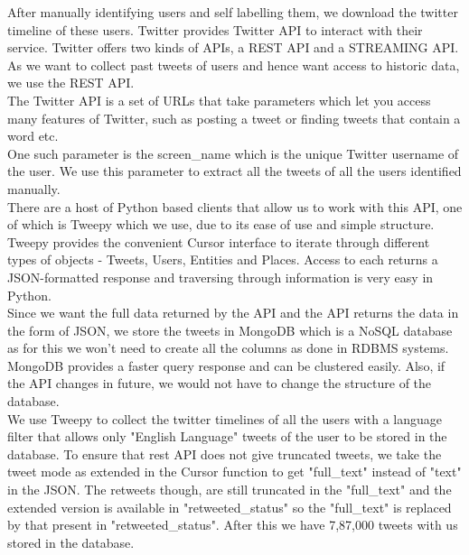 \documentclass[a4paper,11pt]{article}
\begin{document}
After manually identifying users and self labelling them, we download the twitter timeline of these users. Twitter provides Twitter API to interact with their service. Twitter offers two kinds of APIs, a REST API and a STREAMING API. As we want to collect past tweets of users and hence want access to historic data, we use the REST API.
\medskip\\
The Twitter API is a set of URLs that take parameters which let you access many features of Twitter, such as posting a tweet or finding tweets that contain a word etc. \\
One such parameter is the screen\_name which is the unique Twitter username of the user. We use this parameter to extract all the tweets of all the users identified manually.  
\medskip\\
There are a host of Python based clients that allow us to work with this API, one of which is Tweepy which we use, due to its ease of use and simple structure. Tweepy provides the convenient Cursor interface to iterate through different types of objects - Tweets, Users, Entities and Places. Access to each returns a JSON-formatted response and traversing through information is very easy in Python. 
\medskip\\
Since we want the full data returned by the API and the API returns the data in the form of JSON, we store the tweets in MongoDB which is a NoSQL database as for this we won’t need to create all the columns as done in RDBMS systems. MongoDB provides a faster query response and can be clustered easily. Also, if the API changes in future, we would not have to change the structure of the database.
\medskip\\
We use Tweepy to collect the twitter timelines of all the users with a language filter that allows only "English Language" tweets of the user to be stored in the database. To ensure that rest API does not give truncated tweets, we take the tweet mode as extended in the Cursor function to get "full\_text" instead of "text" in the JSON. The retweets though, are still truncated in the "full\_text" and the extended version is available in "retweeted\_status" so the "full\_text" is replaced by that present in "retweeted\_status". After this we have 7,87,000 tweets with us stored in the database.
\vspace*{5mm}

\newpage
\end{document}
